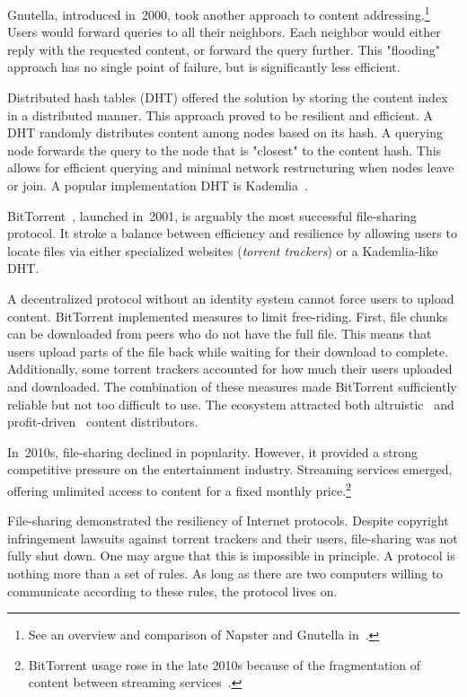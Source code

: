 Gnutella, introduced in~2000, took another approach to content addressing.\footnote{See an overview and comparison of Napster and Gnutella in~\cite{Saroiu2003}.}
Users would forward queries to all their neighbors.
Each neighbor would either reply with the requested content, or forward the query further.
This "flooding" approach has no single point of failure, but is significantly less efficient.

Distributed hash tables (DHT) offered the solution by storing the content index in a distributed manner.
This approach proved to be resilient and efficient.
A DHT randomly distributes content among nodes based on its hash.
A querying node forwards the query to the node that is "closest" to the content hash.
This allows for efficient querying and minimal network restructuring when nodes leave or join.
A popular implementation DHT is Kademlia~\cite{Maymounkov2002}.

BitTorrent~\cite{Pouwelse2005}, launched in~2001, is arguably the most successful file-sharing protocol.
It stroke a balance between efficiency and resilience by allowing users to locate files via either specialized websites (\textit{torrent trackers}) or a Kademlia-like DHT.

A decentralized protocol without an identity system cannot force users to upload content.
BitTorrent implemented measures to limit free-riding.
First, file chunks can be downloaded from peers who do not have the full file.
This means that users upload parts of the file back while waiting for their download to complete.
Additionally, some torrent trackers accounted for how much their users uploaded and downloaded.
The combination of these measures made BitTorrent sufficiently reliable but not too difficult to use.
The ecosystem attracted both altruistic~\cite{Rehn2004} and profit-driven~\cite{Rumin2010} content distributors.

In~2010s, file-sharing declined in popularity.
However, it provided a strong competitive pressure on the entertainment industry.
Streaming services emerged, offering unlimited access to content for a fixed monthly price.\footnote{BitTorrent usage rose in the late 2010s because of the fragmentation of content between streaming services~\cite{Bode2018}.}

File-sharing demonstrated the resiliency of Internet protocols.
Despite copyright infringement lawsuits against torrent trackers and their users, file-sharing was not fully shut down.
One may argue that this is impossible in principle.
A protocol is nothing more than a set of rules.
As long as there are two computers willing to communicate according to these rules, the protocol lives on.

